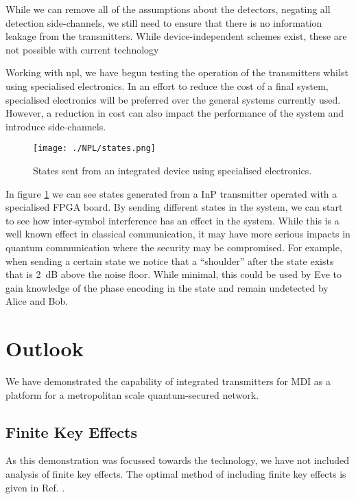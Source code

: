 While we can remove all of the assumptions about the detectors, negating all detection side-channels, we still need to ensure that there is no information leakage from the transmitters. While device-independent schemes exist, these are not possible with current technology

Working with \ac{npl}, we have begun testing the operation of the transmitters whilst using specialised electronics. In an effort to reduce the cost of a final system, specialised electronics will be preferred over the general systems currently used. However, a reduction in cost can also impact the performance of the system and introduce side-channels.

\begin{figure}
	\texttt{[image: ./NPL/states.png]}
	\caption{States sent from an integrated device using specialised electronics.}
	\label{fig:npl_states}
\end{figure}

In figure \ref{fig:npl_states} we can see states generated from a \ac{InP} transmitter operated with a specialised FPGA board. By sending different states in the system, we can start to see how inter-symbol interference has an effect in the system. While this is a well known effect in classical communication, it may have more serious impacts in quantum communication where the security may be compromised. For example, when sending a certain state we notice that a ``shoulder'' after the state exists that is \SI{2}{dB} above the noise floor. While minimal, this could be used by Eve to gain knowledge of the phase encoding in the state and remain undetected by Alice and Bob.

\section{Outlook}

We have demonstrated the capability of integrated transmitters for \acl{MDI} as a platform for a metropolitan scale quantum-secured network. 

\subsection{Finite Key Effects}

As this demonstration was focussed towards the technology, we have not included analysis of finite key effects. The optimal method of including finite key effects is given in Ref. \cite{zhou2016}.

